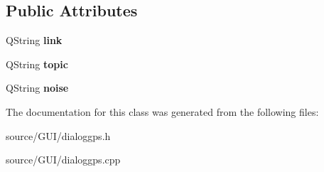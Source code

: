\subsection*{Public Attributes}
\begin{DoxyCompactItemize}
\item 
Q\+String {\bfseries link}\label{class_dialog_gps_aaac069b67a378154b207c8d9538c7062}

\item 
Q\+String {\bfseries topic}\label{class_dialog_gps_ae8ecf01a72aeecbf0bf2c70f52bb3b7b}

\item 
Q\+String {\bfseries noise}\label{class_dialog_gps_a8f38225d895bda26016a1d6171f60a62}

\end{DoxyCompactItemize}


The documentation for this class was generated from the following files\+:\begin{DoxyCompactItemize}
\item 
source/\+G\+U\+I/dialoggps.\+h\item 
source/\+G\+U\+I/dialoggps.\+cpp\end{DoxyCompactItemize}
